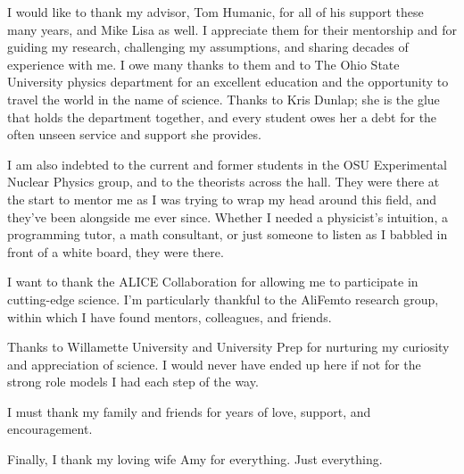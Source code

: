 \begin{acknowledgments}

I would like to thank my advisor, Tom Humanic, for all of his support these many years, and Mike Lisa as well.
I appreciate them for their mentorship and for guiding my research, challenging my assumptions, and sharing decades of experience with me.
I owe many thanks to them and to The Ohio State University physics department for an excellent education and the opportunity to travel the world in the name of science. 
Thanks to Kris Dunlap; she is the glue that holds the department together, and every student owes her a debt for the often unseen service and support she provides.

I am also indebted to the current and former students in the OSU Experimental Nuclear Physics group, and to the theorists across the hall. 
They were there at the start to mentor me as I was trying to wrap my head around this field, and they've been alongside me ever since.
Whether I needed a physicist's intuition, a programming tutor, a math consultant, or just someone to listen as I babbled in front of a white board, they were there.

I want to thank the ALICE Collaboration for allowing me to participate in cutting-edge science.
I'm particularly thankful to the AliFemto research group, within which I have found mentors, colleagues, and friends.

Thanks to Willamette University and University Prep for nurturing my curiosity and appreciation of science.
I would never have ended up here if not for the strong role models I had each step of the way.

I must thank my family and friends for years of love, support, and encouragement.

Finally, I thank my loving wife Amy for everything. Just everything.



\end{acknowledgments}
